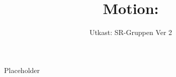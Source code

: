 \documentclass[a4paper]{dtek}
\title{Motion: }
\date{Utkast: SR-Gruppen Ver 2}
\begin{document}
Placeholder
\end{document}
